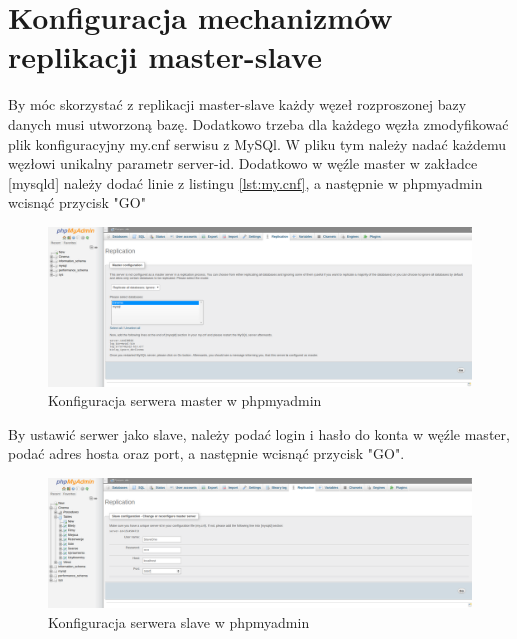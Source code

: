 \section{Konfiguracja mechanizmów replikacji master-slave}
By móc skorzystać z replikacji master-slave każdy węzeł rozproszonej bazy danych musi utworzoną bazę. Dodatkowo trzeba dla każdego węzła zmodyfikować plik konfiguracyjny my.cnf serwisu z MySQl. W pliku tym należy nadać każdemu węzłowi unikalny parametr server-id. Dodatkowo w węźle master w zakładce [mysqld] należy dodać linie z listingu \ref{lst:my.cnf}, a następnie w phpmyadmin  wcisnąć przycisk "GO"

\lssetdef


\begin{figure} [H]
	\centering
	\includegraphics[width=1\linewidth]{rozdzial04/4.png}
	\caption{Konfiguracja serwera master w phpmyadmin}
	\label{fig:phpmyadmin2}
\end{figure}


By ustawić serwer jako slave, należy podać login i hasło do konta w węźle master, podać adres hosta oraz port, a następnie wcisnąć przycisk "GO".

\begin{figure} [H]
	\centering
	\includegraphics[width=1\linewidth]{rozdzial04/3.png}
	\caption{Konfiguracja serwera slave w phpmyadmin}
	\label{fig:phpmyadmin1}
\end{figure}

